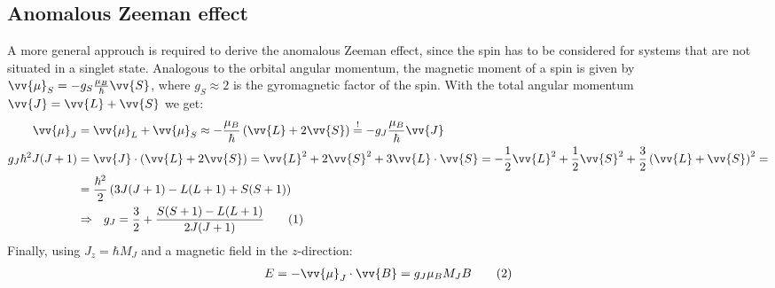 \documentclass[a4paper,12pt]{article}
\newcommand\numberthis{\addtocounter{equation}{1}\tag{\theequation}}
\newcommand{\kla}{}
\begin{document}
\subsection{Anomalous Zeeman effect}
A more general approuch is required to derive the anomalous Zeeman effect, since the spin has to be considered for systems that are not situated in a singlet state. Analogous to the orbital angular momentum, the magnetic moment of a spin is given by $\vv{\mu}_S=-g_S\frac{\mu_B}{\hbar}\vv{S}$, where $g_S\approx 2$ is the gyromagnetic factor of the spin. With the total angular momentum $\vv{J}=\vv{L}+\vv{S}$ we get:
\begin{align*}
\vv{\mu}_J&=\vv{\mu}_L+\vv{\mu}_S\approx -\frac{\mu_B}{\hbar}\kla\left( {\vv{L}+2\vv{S}} \right)\overset{!}{=}-g_J\frac{\mu_B}{\hbar}\vv{J}\\
g_J\hbar^2J(J+1)&=\vv{J}\cdot\kla\left( {\vv{L}+2\vv{S}} \right)=\vv{L}^2+2\vv{S}^2+3\vv{L}\cdot\vv{S}=-\frac{1}{2}\vv{L}^2+\frac{1}{2}\vv{S}^2+\frac{3}{2}\kla\left( {\vv{L}+\vv{S}} \right)^2=\\
&=\frac{\hbar^2}{2}\kla\left( {3J(J+1)-L(L+1)+S(S+1)} \right)\\
&\Rightarrow\ \ g_J=\frac{3}{2}+\frac{S(S+1)-L(L+1)}{2J(J+1)}\numberthis\label{gJ}
\end{align*}
Finally, using $J_z=\hbar M_J$ and a magnetic field in the $z$-direction:
\begin{align*}
E=-\vv{\mu}_J\cdot\vv{B}=g_J\mu_BM_JB\numberthis\label{E von MJ und B}
\end{align*}
\end{document}
